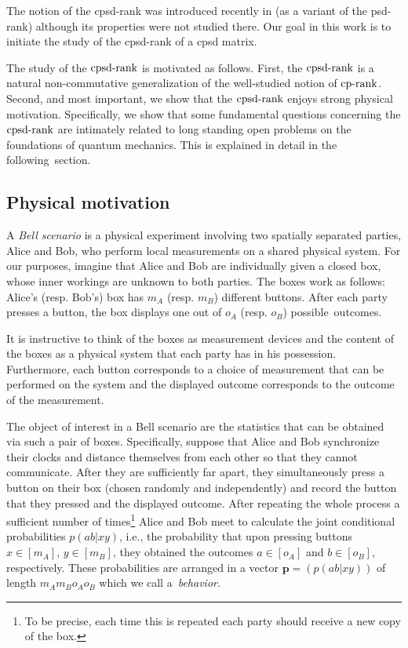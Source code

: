 \documentclass{siamart}
\begin{document}
{The notion of the cpsd-rank was introduced recently in \cite{FGPRT}
(as a   variant of the psd-rank) although its properties
were not studied there. Our goal in  this work is to   initiate the
study  of the 
{cpsd-rank} of a cpsd matrix.

The study of the ${\mathrm{cpsd}\textnormal{-rank}}$  is motivated as follows. First, the ${\mathrm{cpsd}\textnormal{-rank}}$ is  a
natural non-commutative  generalization of the well-studied notion
of ${\mathrm{cp}\textnormal{-rank}}$. {Second},  and most {important}, we show  that  the
 ${\mathrm{cpsd}\textnormal{-rank}}$ enjoys strong physical motivation. Specifically, we
show that some fundamental questions concerning the ${\mathrm{cpsd}\textnormal{-rank}}$ are
intimately  related to long standing   open problems {on} the foundations of
quantum mechanics. This is explained in detail in the
following~section.

\subsection{Physical  motivation}\label{sec:quantumcorrelations}

A  {\em Bell scenario} is a {physical} experiment involving two
{spatially separated}
{parties}, Alice and Bob, who perform {local} measurements on a
shared physical system. For our purposes,  imagine that
Alice and Bob are individually given a  closed  box, whose inner
{workings} are unknown to both parties. The boxes work as follows:
Alice's (resp. Bob's) box has
{$m_A$ (resp. $m_B$) different buttons. After  each party presses  a button, the box displays
one out of $o_A$ (resp. $o_B$) possible~outcomes}.

It is instructive to think of the boxes as measurement devices and the content  of the boxes as a physical system that  each party has in his possession. Furthermore, each button
corresponds to a
choice of measurement that can be performed on the system
and the {displayed outcome}
corresponds to  the outcome of the measurement.

{The object of interest in a Bell scenario are {the} statistics that can be obtained via such a pair of boxes. Specifically,
suppose that Alice and Bob synchronize their clocks and  distance themselves from each other so that they
cannot communicate. After they are sufficiently far apart, they simultaneously press a button on their box
(chosen randomly and independently) and record the button that they
pressed and the displayed outcome. After repeating the whole process a sufficient number of times\footnote{To be precise, each time this is repeated each party  should receive a new  copy of the box.}
Alice and Bob
meet to calculate the joint conditional probabilities $p(ab|xy)$, i.e.,
the probability that upon pressing buttons
$x\in[m_A]$, $y\in [m_B]$, they  obtained the outcomes $a\in [o_A]$ and $b\in [o_B]$, respectively.
These probabilities   are  arranged in a vector  ${\mathbf{p}}={(p(ab|xy))}$ of length $m_Am_Bo_Ao_B$ which we call a~{\em behavior}.

}}
\end{document}
